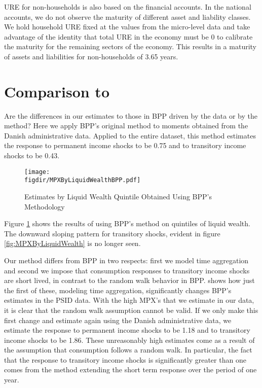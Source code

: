 \documentclass[titlepage]{\econtex}\newcommand{\texname}{ConsumptionHeterogeneity}
\newcommand{\figdir}{../Code/Rcode/Figures/AEJ_revision}
\begin{document}
	URE for non-households is also based on the financial accounts. In the national accounts, we do not observe the maturity of different asset and liability classes. We hold household URE fixed at the values from the micro-level data and take advantage of the identity that total URE in the economy must be 0 to calibrate the maturity for the remaining sectors of the economy. This results in a maturity of assets and liabilities for non-households of 3.65 years.
	
	\section{Comparison to \cite{blundell_consumption_2008}} \label{BPP_compare}
	Are the differences in our estimates to those in BPP driven by the data or by the method? Here we apply BPP's original method to moments obtained from the Danish administrative data. Applied to the entire dataset, this method estimates the response to permanent income shocks to be 0.75 and to transitory income shocks to be 0.43. 
	
	\begin{figure} 
		\begin{centering}
			\texttt{[image: \\figdir/MPXByLiquidWealthBPP.pdf]}
			\caption{Estimates by Liquid Wealth Quintile Obtained Using BPP's Methodology}
			\label{fig:BPP_liquid}
		\end{centering}
	\end{figure}
	
	Figure \ref{fig:BPP_liquid} shows the results of using BPP's method on quintiles of liquid wealth. The downward sloping pattern for transitory shocks, evident in figure \ref{fig:MPXByLiquidWealth} is no longer seen.
	
	Our method differs from BPP in two respects: first we model time aggregation and second we impose that consumption responses to transitory income shocks are short lived, in contrast to the random walk behavior in BPP.  shows how just the first of these, modeling time aggregation, significantly changes BPP's estimates in the PSID data. With the high MPX's that we estimate in our data, it is clear that the random walk assumption cannot be valid. If we only make this first change and estimate again using the Danish administrative data, we estimate the response to permanent income shocks to be 1.18 and to transitory income shocks to be 1.86. These unreasonably high estimates come as a result of the assumption that consumption follows a random walk. In particular, the fact that the response to transitory income shocks is significantly greater than one comes from the method extending the short term response over the period of one year.
	
\end{document}
